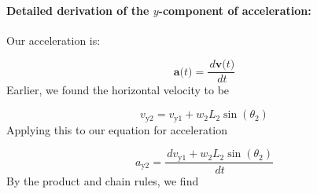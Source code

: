 \documentclass[12pt]{article}
\begin{document}
\paragraph{Detailed derivation of the $y$-component of acceleration:}
\label{GD:accelerationY2Deriv}
Our acceleration is:

\begin{displaymath}
\symbf{a}\text{(}t\text{)}=\frac{\,d\symbf{v}\text{(}t\text{)}}{\,dt}
\end{displaymath}
Earlier, we found the horizontal velocity to be

\begin{displaymath}
{v_{\text{y}2}}={v_{\text{y}1}}+{w_{2}} {L_{2}} \sin\left({θ_{2}}\right)
\end{displaymath}
Applying this to our equation for acceleration

\begin{displaymath}
{a_{\text{y}2}}=\frac{\,d{v_{\text{y}1}}+{w_{2}} {L_{2}} \sin\left({θ_{2}}\right)}{\,dt}
\end{displaymath}
By the product and chain rules, we find
\end{document}
